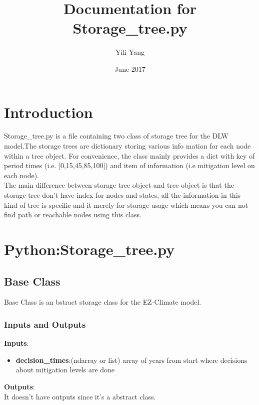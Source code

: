 \documentclass[12pt]{article}
\title{Documentation for Storage\_tree.py}
\author{Yili Yang}
\date{June 2017}
\begin{document}
\maketitle

\section{Introduction}
Storage\_tree.py is a file containing two class of storage tree for the DLW model.The storage trees are dictionary storing various info mation for each node within a tree object. For convenience, the class mainly provides a dict with key of period times (i.e. [0,15,45,85,100]) and item of information (i.e mitigation level on each node). \\
The main difference between storage tree object and tree object is that the storage tree don't have index for nodes and states, all the information in this kind of tree is specific and it merely for storage usage which means you can not find path or reachable nodes using this class.

\section{Python:Storage\_tree.py}
\subsection{Base Class}
 Base Class is an bstract storage class for the EZ-Climate model.
\subsubsection{Inputs and Outputs}
\textbf{Inputs}:
\begin{itemize}
\item \textbf{decision\_times}:(ndarray or list) array of years from start where decisions about mitigation levels are done
\end{itemize}
\textbf{Outputs}:\\
It doesn't have outputs since it's a abstract class.
\end{document}
